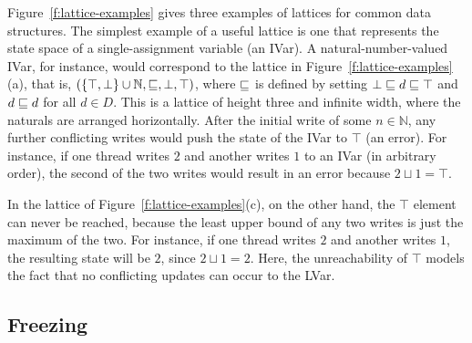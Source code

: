 \documentclass{article}
\begin{document}
Figure~\ref{f:lattice-examples} gives three examples of lattices for
common data structures.  The simplest example of a useful lattice is
one that represents the state space of a single-assignment variable
(an IVar).  A natural-number-valued IVar, for instance, would
correspond to the lattice in Figure~\ref{f:lattice-examples}(a), that
is, $(\lbrace \top, \bot \rbrace \cup \mathbb{N}, \sqsubseteq, \bot,
\top)$, where $\sqsubseteq$ is defined by setting $\bot \sqsubseteq d
\sqsubseteq \top$ and $d \sqsubseteq d$ for all $d \in D$.  This is a
lattice of height three and infinite width, where the naturals are
arranged horizontally.  After the initial write of some $n \in
\mathbb{N}$, any further conflicting writes would push the state of
the IVar to $\top$ (an error).  For instance, if one thread writes $2$
and another writes $1$ to an IVar (in arbitrary order), the second of
the two writes would result in an error because $2 \sqcup 1 = \top$.

In the lattice of Figure~\ref{f:lattice-examples}(c), on the other
hand, the $\top$ element can never be reached, because the least upper
bound of any two writes is just the maximum of the two.  For instance,
if one thread writes $2$ and another writes $1$, the resulting state
will be $2$, since $2 \sqcup 1 = 2$.  Here, the unreachability of
$\top$ models the fact that no conflicting updates can occur to the
LVar.

\subsection{Freezing}
 
\end{document}
